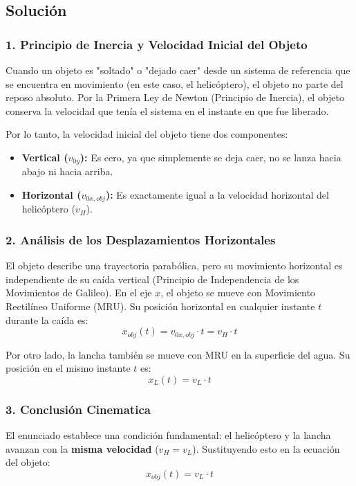 \documentclass[12pt, a4paper]{article}
\begin{document}
\subsection*{Solución}

\subsubsection*{1. Principio de Inercia y Velocidad Inicial del Objeto}
Cuando un objeto es "soltado" o "dejado caer" desde un sistema de referencia que se encuentra en movimiento (en este caso, el helicóptero), el objeto no parte del reposo absoluto. Por la Primera Ley de Newton (Principio de Inercia), el objeto conserva la velocidad que tenía el sistema en el instante en que fue liberado.

Por lo tanto, la velocidad inicial del objeto tiene dos componentes:
\begin{itemize}
    \item \textbf{Vertical ($v_{0y}$):} Es cero, ya que simplemente se deja caer, no se lanza hacia abajo ni hacia arriba.
    \item \textbf{Horizontal ($v_{0x, obj}$):} Es exactamente igual a la velocidad horizontal del helicóptero ($v_H$).
\end{itemize}

\subsubsection*{2. Análisis de los Desplazamientos Horizontales}
El objeto describe una trayectoria parabólica, pero su movimiento horizontal es independiente de su caída vertical (Principio de Independencia de los Movimientos de Galileo). En el eje $x$, el objeto se mueve con Movimiento Rectilíneo Uniforme (MRU).
Su posición horizontal en cualquier instante $t$ durante la caída es:
$$ x_{obj}(t) = v_{0x, obj} \cdot t = v_H \cdot t $$

Por otro lado, la lancha también se mueve con MRU en la superficie del agua. Su posición en el mismo instante $t$ es:
$$ x_{L}(t) = v_L \cdot t $$

\subsubsection*{3. Conclusión Cinematica}
El enunciado establece una condición fundamental: el helicóptero y la lancha avanzan con la \textbf{misma velocidad} ($v_H = v_L$).
Sustituyendo esto en la ecuación del objeto:
$$ x_{obj}(t) = v_L \cdot t $$
\end{document}
